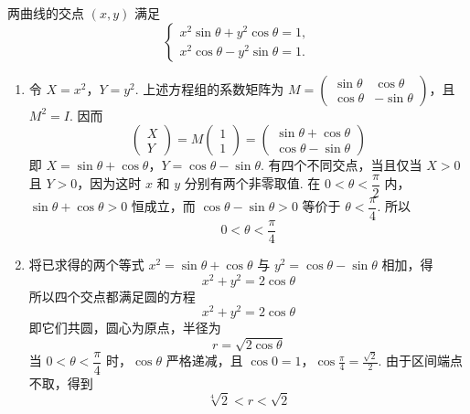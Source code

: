 \begin{solution}
两曲线的交点 \((x,y)\) 满足
\[
\begin{cases}
x^2\sin\theta+y^2\cos\theta=1,\\
x^2\cos\theta-y^2\sin\theta=1.
\end{cases}
\]
\begin{enumerate}
\item 令 \(X=x^2\)，\(Y=y^2\). 上述方程组的系数矩阵为
\(M=\begin{pmatrix}\sin\theta&\cos\theta\\\cos\theta&-\sin\theta\end{pmatrix}\)，且 \(M^2=I\). 因而
\[
\begin{pmatrix}X\\Y\end{pmatrix}
=M\begin{pmatrix}1\\1\end{pmatrix}
=\begin{pmatrix}\sin\theta+\cos\theta\\\cos\theta-\sin\theta\end{pmatrix}
\]
即
\(X=\sin\theta+\cos\theta\)，\(Y=\cos\theta-\sin\theta\).
有四个不同交点，当且仅当 \(X>0\) 且 \(Y>0\)，因为这时 \(x\) 和 \(y\) 分别有两个非零取值. 在 \(0<\theta<\dfrac\pi2\) 内，\(\sin\theta+\cos\theta>0\) 恒成立，而 \(\cos\theta-\sin\theta>0\) 等价于 \(\theta<\dfrac\pi4\). 所以
\[
0<\theta<\frac\pi4
\]

\item 将已求得的两个等式 \(x^2=\sin\theta+\cos\theta\) 与 \(y^2=\cos\theta-\sin\theta\) 相加，得
\[
x^2+y^2=2\cos\theta
\]
所以四个交点都满足圆的方程
\[
x^2+y^2=2\cos\theta
\]
即它们共圆，圆心为原点，半径为
\[
r=\sqrt{2\cos\theta}
\]
当 \(0<\theta<\dfrac\pi4\) 时，\(\cos\theta\) 严格递减，且
\(\cos0=1\)，\(\cos\frac\pi4=\frac{\sqrt2}{2}\).
由于区间端点不取，得到
\[
\sqrt[4]{2}<r<\sqrt2
\]
\end{enumerate}
\end{solution}
